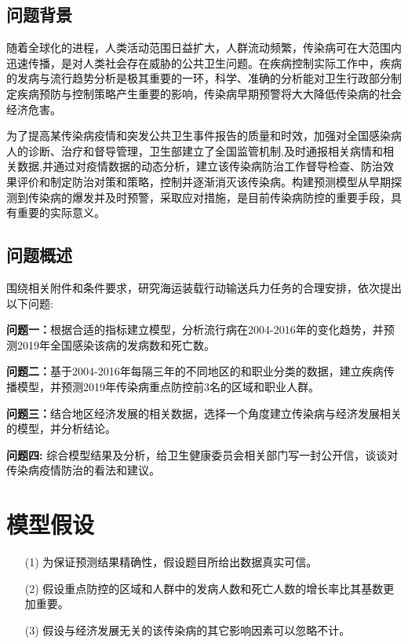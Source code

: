 \documentclass{whutmod}
\begin{document}
	\subsection{问题背景}
    随着全球化的进程，人类活动范围日益扩大，人群流动频繁，传染病可在大范围内迅速传播，是对人类社会存在威胁的公共卫生问题。在疾病控制实际工作中，疾病的发病与流行趋势分析是极其重要的一环，科学、准确的分析能对卫生行政部分制定疾病预防与控制策略产生重要的影响，传染病早期预警将大大降低传染病的社会经济危害。
    
    为了提高某传染病疫情和突发公共卫生事件报告的质量和时效，加强对全国感染病人的诊断、治疗和督导管理，卫生部建立了全国监管机制,及时通报相关病情和相关数据,并通过对疫情数据的动态分析，建立该传染病防治工作督导检查、防治效果评价和制定防治对策和策略，控制并逐渐消灭该传染病。构建预测模型从早期探测到传染病的爆发并及时预警，采取应对措施，是目前传染病防控的重要手段，具有重要的实际意义。
    
    

	\subsection{问题概述}
    围绕相关附件和条件要求，研究海运装载行动输送兵力任务的合理安排，依次提出以下问题:
		 
	
	\textbf{问题一：}根据合适的指标建立模型，分析流行病在2004-2016年的变化趋势，并预测2019年全国感染该病的发病数和死亡数。
	
	\textbf{问题二：}基于2004-2016年每隔三年的不同地区的和职业分类的数据，建立疾病传播模型，并预测2019年传染病重点防控前3名的区域和职业人群。
		
	\textbf{问题三：}结合地区经济发展的相关数据，选择一个角度建立传染病与经济发展相关的模型，并分析结论。
	
	\textbf{问题四: }综合模型结果及分析，给卫生健康委员会相关部门写一封公开信，谈谈对传染病疫情防治的看法和建议。
	
	
	\section{模型假设}
	\begin{itemize}                                             
		\item [(1)] 为保证预测结果精确性，假设题目所给出数据真实可信。
		\item [(2)] 假设重点防控的区域和人群中的发病人数和死亡人数的增长率比其基数更加重要。
		\item [(3)] 假设与经济发展无关的该传染病的其它影响因素可以忽略不计。
	
	\end{itemize}		
\end{document}

